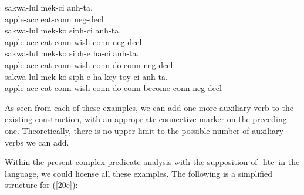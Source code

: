 \documentclass[output=paper]{langsci/langscibook}
\begin{document}
\begin{exe}
\ex \begin{xlist}
\ex \gll sakwa-lul mek-ci anh-ta. \\
apple-{\sc acc} eat-{\sc conn} {\sc neg}-{\sc decl} \\

\ex \gll sakwa-lul mek-ko siph-ci anh-ta. \\
apple-{\sc acc} eat-{\sc conn} wish-{\sc conn} {\sc neg}-{\sc decl} \\

\ex \label{20c} \gll sakwa-lul mek-ko siph-e ha-ci anh-ta. \\
apple-{\sc acc} eat-{\sc conn} wish-{\sc conn} do-{\sc conn} {\sc neg}-{\sc decl} \\

\ex \gll sakwa-lul mek-ko siph-e ha-key toy-ci anh-ta. \\
apple-{\sc acc} eat-{\sc conn} wish-{\sc conn} do-{\sc conn} become-{\sc conn} {\sc neg}-{\sc decl} \\
\end{xlist} \end{exe}



  As seen from each of these examples, we can add one more auxiliary verb to the
  existing construction, with an appropriate
  connective marker on the preceding one. Theoretically, there is no upper limit to the possible number  of auxiliary
  verbs we can add.

  Within the present complex-predicate analysis with
  the supposition of \hd-lite\ in the language, we could
  license all these examples. The following is
  a simplified structure for (\ref{20c}):
\end{document}
